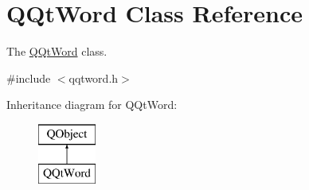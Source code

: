 \hypertarget{class_q_qt_word}{}\section{Q\+Qt\+Word Class Reference}
\label{class_q_qt_word}


The \mbox{\hyperlink{class_q_qt_word}{Q\+Qt\+Word}} class.  




{\ttfamily \#include $<$qqtword.\+h$>$}

Inheritance diagram for Q\+Qt\+Word\+:\begin{figure}[H]
\begin{center}
\leavevmode
\includegraphics[height=2.000000cm]{class_q_qt_word}
\end{center}
\end{figure}
